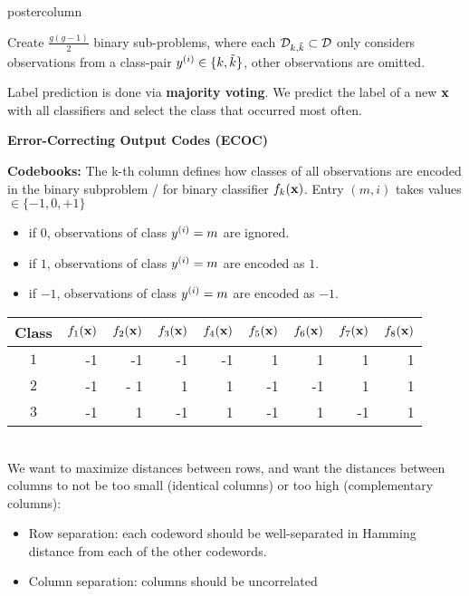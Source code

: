 \documentclass{beamer}
\begin{document}
\begin{frame}[fragile]{}
\begin{columns}
\begin{column}{.31\textwidth}
\begin{beamercolorbox}[center]{postercolumn}
\begin{minipage}{.98\textwidth}
{\begin{myblock}{}
Create $\frac{g(g - 1)}{2}$ binary sub-problems, where each $\mathcal{D}_{k, \tilde k} \subset \mathcal{D}$ only considers observations from a class-pair $y^{(i)} \in \{k, \tilde k\}$, other observations are omitted.

Label prediction is done via \textbf{majority voting}. We predict the label of a new $\mathbf{x}$ with all classifiers and select the class that occurred most often. 

    \begin{codebox} 
  \textbf{Error-Correcting Output Codes (ECOC)}
  \end{codebox}

  \textbf{Codebooks:} The k-th column defines how classes of all observations are encoded in the binary subproblem / for binary classifier $f_k(\mathbf{x})$.
								Entry $(m, i)$ takes values $\in \{-1, 0, +1\}$
								\begin{itemize}
									\setlength{\itemindent}{+.3in}
									\item if $0$, observations of class $y^{(i)} = m$ are ignored.
									\item if $1$, observations of class $y^{(i)} = m$ are encoded as $1$.
									\item if $- 1$, observations of class $y^{(i)} = m$ are encoded as $- 1$.
								\end{itemize}
  \begin{table}[]
  \begin{tabular}{|c|r|r|r|r|r|r|r|r|} \hline
  \textbf{Class}  & \textbf{$f_1{(\mathbf{x})}$} & \textbf{$f_2{(\mathbf{x})}$}  & \textbf{$f_3{(\mathbf{x})}$} & \textbf{$f_4{(\mathbf{x})}$} & \textbf{$f_5{(\mathbf{x})}$} & \textbf{$f_6{(\mathbf{x})}$} & \textbf{$f_7{(\mathbf{x})}$} & \textbf{$f_8{(\mathbf{x})}$}\\ \hline
  \textbf{$1$} & -1 & -1 & -1 & -1 & 1 & 1 & 1 & 1 \\ \hline
  \textbf{$2$} & -1 & - 1 & 1 & 1 & -1 & -1 & 1 & 1 \\ \hline
  \textbf{$3$} & -1 & 1 & -1 & 1 & -1 & 1 & -1 & 1\\ \hline
  \end{tabular}
  \end{table}\\

  We want to maximize distances between rows, and want the distances between columns to not be too small (identical columns) or too high (complementary columns):
  \begin{itemize}[$\bullet$] 
  \setlength{\itemindent}{+.3in}
  \item Row separation: each codeword should be well-separated in Hamming distance from each of the other codewords.
  \item Column separation: columns should be uncorrelated
  \end{itemize}\\


\end{myblock}}
\end{minipage}
\end{beamercolorbox}
\end{column}
\end{columns}
\end{frame}
\end{document}
